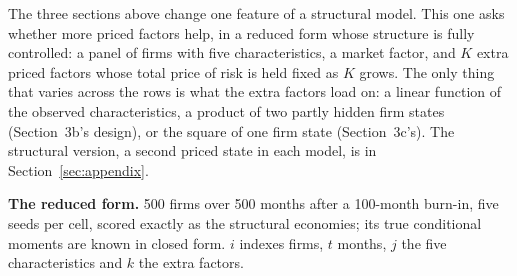 \documentclass[11pt]{article}
\begin{document}
The three sections above change one feature of a structural model. This one asks whether more priced factors help, in a reduced form whose structure is fully controlled: a panel of firms with five characteristics, a market factor, and $K$ extra priced factors whose total price of risk is held fixed as $K$ grows. The only thing that varies across the rows is what the extra factors load on: a linear function of the observed characteristics, a product of two partly hidden firm states (Section~3b's design), or the square of one firm state (Section~3c's). The structural version, a second priced state in each model, is in Section~\ref{sec:appendix}.

\textbf{The reduced form.} 500 firms over 500 months after a 100-month burn-in, five seeds per cell, scored exactly as the structural economies; its true conditional moments are known in closed form. $i$ indexes firms, $t$ months, $j$ the five characteristics and $k$ the extra factors.
\end{document}
